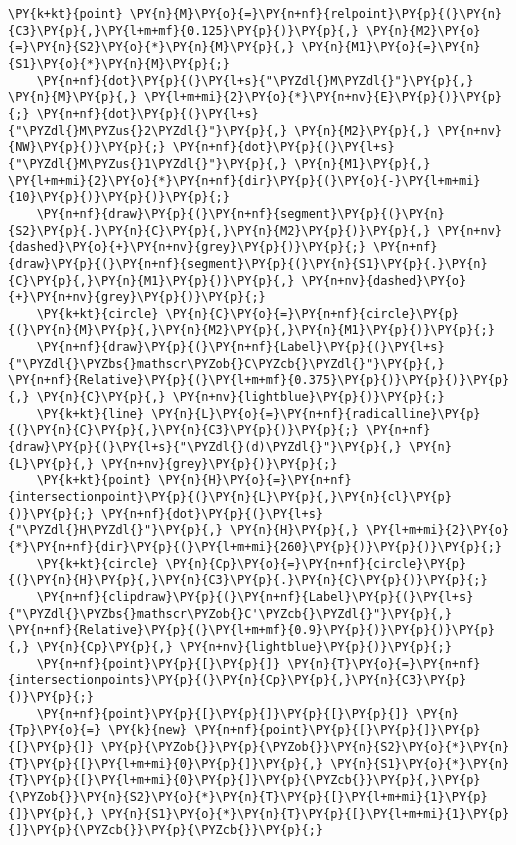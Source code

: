 \begin{Verbatim}[commandchars=\\\{\}]
    \PY{k+kt}{point} \PY{n}{M}\PY{o}{=}\PY{n+nf}{relpoint}\PY{p}{(}\PY{n}{C3}\PY{p}{,}\PY{l+m+mf}{0.125}\PY{p}{)}\PY{p}{,} \PY{n}{M2}\PY{o}{=}\PY{n}{S2}\PY{o}{*}\PY{n}{M}\PY{p}{,} \PY{n}{M1}\PY{o}{=}\PY{n}{S1}\PY{o}{*}\PY{n}{M}\PY{p}{;}
    \PY{n+nf}{dot}\PY{p}{(}\PY{l+s}{"\PYZdl{}M\PYZdl{}"}\PY{p}{,} \PY{n}{M}\PY{p}{,} \PY{l+m+mi}{2}\PY{o}{*}\PY{n+nv}{E}\PY{p}{)}\PY{p}{;} \PY{n+nf}{dot}\PY{p}{(}\PY{l+s}{"\PYZdl{}M\PYZus{}2\PYZdl{}"}\PY{p}{,} \PY{n}{M2}\PY{p}{,} \PY{n+nv}{NW}\PY{p}{)}\PY{p}{;} \PY{n+nf}{dot}\PY{p}{(}\PY{l+s}{"\PYZdl{}M\PYZus{}1\PYZdl{}"}\PY{p}{,} \PY{n}{M1}\PY{p}{,} \PY{l+m+mi}{2}\PY{o}{*}\PY{n+nf}{dir}\PY{p}{(}\PY{o}{-}\PY{l+m+mi}{10}\PY{p}{)}\PY{p}{)}\PY{p}{;}
    \PY{n+nf}{draw}\PY{p}{(}\PY{n+nf}{segment}\PY{p}{(}\PY{n}{S2}\PY{p}{.}\PY{n}{C}\PY{p}{,}\PY{n}{M2}\PY{p}{)}\PY{p}{,} \PY{n+nv}{dashed}\PY{o}{+}\PY{n+nv}{grey}\PY{p}{)}\PY{p}{;} \PY{n+nf}{draw}\PY{p}{(}\PY{n+nf}{segment}\PY{p}{(}\PY{n}{S1}\PY{p}{.}\PY{n}{C}\PY{p}{,}\PY{n}{M1}\PY{p}{)}\PY{p}{,} \PY{n+nv}{dashed}\PY{o}{+}\PY{n+nv}{grey}\PY{p}{)}\PY{p}{;}
    \PY{k+kt}{circle} \PY{n}{C}\PY{o}{=}\PY{n+nf}{circle}\PY{p}{(}\PY{n}{M}\PY{p}{,}\PY{n}{M2}\PY{p}{,}\PY{n}{M1}\PY{p}{)}\PY{p}{;}
    \PY{n+nf}{draw}\PY{p}{(}\PY{n+nf}{Label}\PY{p}{(}\PY{l+s}{"\PYZdl{}\PYZbs{}mathscr\PYZob{}C\PYZcb{}\PYZdl{}"}\PY{p}{,} \PY{n+nf}{Relative}\PY{p}{(}\PY{l+m+mf}{0.375}\PY{p}{)}\PY{p}{)}\PY{p}{,} \PY{n}{C}\PY{p}{,} \PY{n+nv}{lightblue}\PY{p}{)}\PY{p}{;}
    \PY{k+kt}{line} \PY{n}{L}\PY{o}{=}\PY{n+nf}{radicalline}\PY{p}{(}\PY{n}{C}\PY{p}{,}\PY{n}{C3}\PY{p}{)}\PY{p}{;} \PY{n+nf}{draw}\PY{p}{(}\PY{l+s}{"\PYZdl{}(d)\PYZdl{}"}\PY{p}{,} \PY{n}{L}\PY{p}{,} \PY{n+nv}{grey}\PY{p}{)}\PY{p}{;}
    \PY{k+kt}{point} \PY{n}{H}\PY{o}{=}\PY{n+nf}{intersectionpoint}\PY{p}{(}\PY{n}{L}\PY{p}{,}\PY{n}{cl}\PY{p}{)}\PY{p}{;} \PY{n+nf}{dot}\PY{p}{(}\PY{l+s}{"\PYZdl{}H\PYZdl{}"}\PY{p}{,} \PY{n}{H}\PY{p}{,} \PY{l+m+mi}{2}\PY{o}{*}\PY{n+nf}{dir}\PY{p}{(}\PY{l+m+mi}{260}\PY{p}{)}\PY{p}{)}\PY{p}{;}
    \PY{k+kt}{circle} \PY{n}{Cp}\PY{o}{=}\PY{n+nf}{circle}\PY{p}{(}\PY{n}{H}\PY{p}{,}\PY{n}{C3}\PY{p}{.}\PY{n}{C}\PY{p}{)}\PY{p}{;}
    \PY{n+nf}{clipdraw}\PY{p}{(}\PY{n+nf}{Label}\PY{p}{(}\PY{l+s}{"\PYZdl{}\PYZbs{}mathscr\PYZob{}C'\PYZcb{}\PYZdl{}"}\PY{p}{,} \PY{n+nf}{Relative}\PY{p}{(}\PY{l+m+mf}{0.9}\PY{p}{)}\PY{p}{)}\PY{p}{,} \PY{n}{Cp}\PY{p}{,} \PY{n+nv}{lightblue}\PY{p}{)}\PY{p}{;}
    \PY{n+nf}{point}\PY{p}{[}\PY{p}{]} \PY{n}{T}\PY{o}{=}\PY{n+nf}{intersectionpoints}\PY{p}{(}\PY{n}{Cp}\PY{p}{,}\PY{n}{C3}\PY{p}{)}\PY{p}{;}
    \PY{n+nf}{point}\PY{p}{[}\PY{p}{]}\PY{p}{[}\PY{p}{]} \PY{n}{Tp}\PY{o}{=} \PY{k}{new} \PY{n+nf}{point}\PY{p}{[}\PY{p}{]}\PY{p}{[}\PY{p}{]} \PY{p}{\PYZob{}}\PY{p}{\PYZob{}}\PY{n}{S2}\PY{o}{*}\PY{n}{T}\PY{p}{[}\PY{l+m+mi}{0}\PY{p}{]}\PY{p}{,} \PY{n}{S1}\PY{o}{*}\PY{n}{T}\PY{p}{[}\PY{l+m+mi}{0}\PY{p}{]}\PY{p}{\PYZcb{}}\PY{p}{,}\PY{p}{\PYZob{}}\PY{n}{S2}\PY{o}{*}\PY{n}{T}\PY{p}{[}\PY{l+m+mi}{1}\PY{p}{]}\PY{p}{,} \PY{n}{S1}\PY{o}{*}\PY{n}{T}\PY{p}{[}\PY{l+m+mi}{1}\PY{p}{]}\PY{p}{\PYZcb{}}\PY{p}{\PYZcb{}}\PY{p}{;}

\end{Verbatim}

